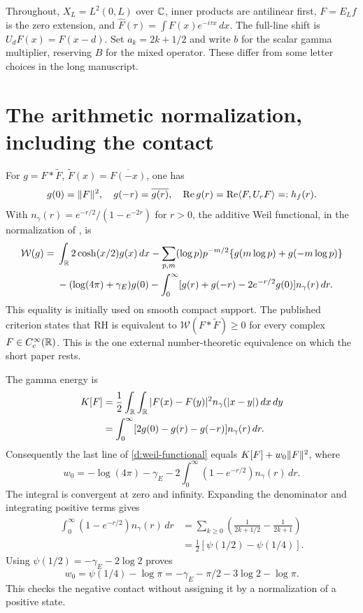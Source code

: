 Throughout, $X_L=L^2(0,L)$ over $\mathbb C$, inner products are antilinear first,
$F=E_Lf$ is the zero extension, and
$\widehat F(\tau)=\int F(x)e^{-i\tau x}\,dx$.
The full-line shift is $U_dF(x)=F(x-d)$.
Set $a_k=2k+1/2$ and write $b$ for the scalar gamma multiplier, reserving
$B$ for the mixed operator. These differ from some letter choices in the
long manuscript.

\section{The arithmetic normalization, including the contact}
For $g=F*\widetilde F$, $\widetilde F(x)=\overline{F(-x)}$, one has
\[
g(0)=\lVert F\rVert^2,\quad g(-r)=\overline{g(r)},\quad
\operatorname{Re} g(r)=\operatorname{Re}\langle F,U_rF\rangle=:h_f(r).
\]
With $n_\gamma(r)=e^{-r/2}/(1-e^{-2r})$ for $r>0$, the additive
Weil functional, in the normalization of \cite[Section 1.1]{Suzuki}, is
\begin{align}
\mathcal W(g)={}&\int_\mathbb R 2\cosh(x/2)g(x)\,dx
-\sum_{p,m}(\log p)p^{-m/2}\{g(m\log p)+g(-m\log p)\}\notag\\
&-(\log(4\pi)+\gamma_E)g(0)
-\int_0^\infty[g(r)+g(-r)-2e^{-r/2}g(0)]n_\gamma(r)\,dr.
\label{d:weil-functional}
\end{align}
This equality is initially used on smooth compact support. The published
criterion states that RH is equivalent to $\mathcal W(F*\widetilde F)\ge0$
for every complex $F\in C_c^\infty(\mathbb R)$. This is the one external
number-theoretic equivalence on which the short paper rests.

The gamma energy is
\begin{align}
K[F]&=\frac12\int_\mathbb R\int_\mathbb R
 |F(x)-F(y)|^2n_\gamma(|x-y|)\,dx\,dy\notag\\
&=\int_0^\infty[2g(0)-g(r)-g(-r)]n_\gamma(r)\,dr.
\end{align}
Consequently the last line of \eqref{d:weil-functional} equals
$K[F]+w_0\lVert F\rVert^2$, where
\[
w_0=-\log(4\pi)-\gamma_E
-2\int_0^\infty(1-e^{-r/2})n_\gamma(r)\,dr.
\]
The integral is convergent at zero and infinity. Expanding the denominator
and integrating positive terms gives
\begin{align*}
\int_0^\infty(1-e^{-r/2})n_\gamma(r)\,dr
&=\sum_{k\ge0}\left(\frac1{2k+1/2}-\frac1{2k+1}\right)\\
&=\tfrac12[\psi(1/2)-\psi(1/4)].
\end{align*}
Using $\psi(1/2)=-\gamma_E-2\log2$ proves
\begin{equation}\label{d:contact}
w_0=\psi(1/4)-\log\pi
=-\gamma_E-\pi/2-3\log2-\log\pi.
\end{equation}
This checks the negative contact without assigning it by a normalization
of a positive state.

